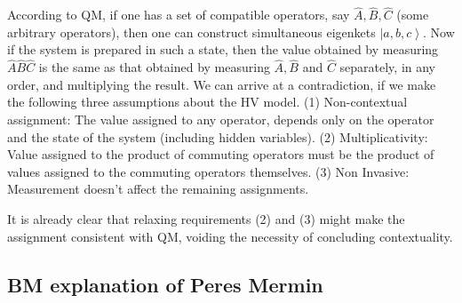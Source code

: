 According to QM, if one has a set of compatible operators, say $\hat{A},\hat{B},\hat{C}$
(some arbitrary operators), then one can construct simultaneous eigenkets
$\left|a,b,c\right\rangle $. Now if the system is prepared in such
a state, then the value obtained by measuring $\hat{A}\hat{B}\hat{C}$
is the same as that obtained by measuring $\hat{A},\hat{B}$ and $\hat{C}$
separately, in any order, and multiplying the result. We can arrive
at a contradiction, if we make the following three assumptions about
the HV model. (1) Non-contextual assignment: The value assigned to
any operator, depends only on the operator and the state of the system
(including hidden variables). (2) Multiplicativity: Value assigned
to the product of commuting operators must be the product of values
assigned to the commuting operators themselves. (3) Non Invasive:
Measurement doesn't affect the remaining assignments.

It is already clear that relaxing requirements (2) and (3) might make
the assignment consistent with QM, voiding the necessity of concluding
contextuality.


\subsection{BM explanation of Peres Mermin \label{sub:BM-consistent-PM}}

